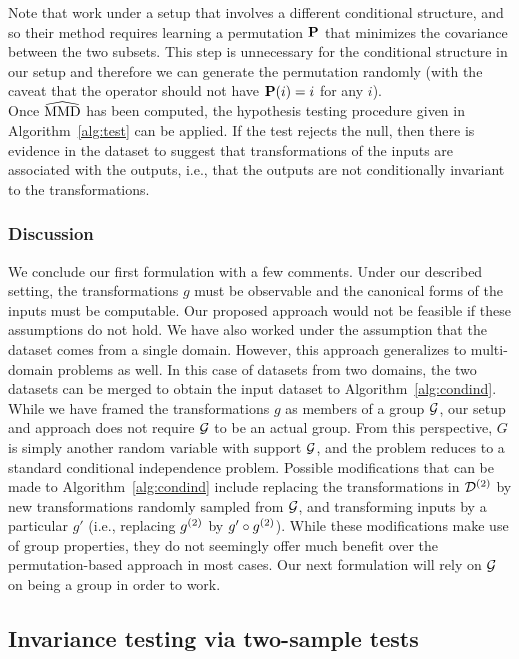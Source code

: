 Note that \textcite{Doran:2014} work under a setup that involves a different conditional structure, and so their method requires learning a permutation $\mathbf{P}$ that minimizes the covariance between the two subsets. This step is unnecessary for the conditional structure in our setup and therefore we can generate the permutation randomly (with the caveat that the operator should not have $\mathbf{P}(i)=i$ for any $i$).
\\

Once $\widehat{\mathrm{MMD}}$ has been computed, the hypothesis testing procedure given in Algorithm~\ref{alg:test} can be applied. If the test rejects the null, then there is evidence in the dataset to suggest that transformations of the inputs are associated with the outputs, i.e., that the outputs are not conditionally invariant to the transformations.

\subsubsection{Discussion}

We conclude our first formulation with a few comments. Under our described setting, the transformations $g$ must be observable and the canonical forms of the inputs must be computable. Our proposed approach would not be feasible if these assumptions do not hold. We have also worked under the assumption that the dataset comes from a single domain. However, this approach generalizes to multi-domain problems as well. In this case of datasets from two domains, the two datasets can be merged to obtain the input dataset to Algorithm~\ref{alg:condind}.
\\

While we have framed the transformations $g$ as members of a group $\mathcal{G}$, our setup and approach does not require $\mathcal{G}$ to be an actual group. From this perspective, $G$ is simply another random variable with support $\mathcal{G}$, and the problem reduces to a standard conditional independence problem. Possible modifications that can be made to Algorithm~\ref{alg:condind} include replacing the transformations in $\mathcal{D}^{(2)}$ by new transformations randomly sampled from $\mathcal{G}$, and transforming inputs by a particular $g'$ (i.e., replacing $g^{(2)}$ by $g'\circ g^{(2)}$). While these modifications make use of group properties, they do not seemingly offer much benefit over the permutation-based approach in most cases. Our next formulation will rely on $\mathcal{G}$ on being a group in order to work.


\subsection{Invariance testing via two-sample tests} \label{sec:twosample}


